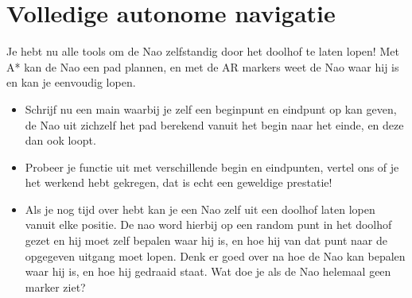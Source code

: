 \documentclass[a4paper]{article}
\begin{document}
\section{Volledige autonome navigatie}

Je hebt nu alle tools om de Nao zelfstandig door het doolhof te laten lopen! Met A* kan de Nao een pad plannen, en met de AR markers weet de Nao waar hij is en kan je eenvoudig lopen.

\begin{Exercise}
\begin{itemize}
\item Schrijf nu een main waarbij je zelf een beginpunt en eindpunt op kan geven, de Nao uit zichzelf het pad berekend vanuit het begin naar het einde, en deze dan ook loopt.
\item Probeer je functie uit met verschillende begin en eindpunten, vertel ons of je het werkend hebt gekregen, dat is echt een geweldige prestatie!
\item Als je nog tijd over hebt kan je een Nao zelf uit een doolhof laten lopen vanuit elke positie. De nao word hierbij op een random punt in het doolhof gezet en hij moet zelf bepalen waar hij is, en hoe hij van dat punt naar de opgegeven uitgang moet lopen. Denk er goed over na hoe de Nao kan bepalen waar hij is, en hoe hij gedraaid staat. Wat doe je als de Nao helemaal geen marker ziet?
\end{itemize}
\end{Exercise}
\vspace{10 mm}
\end{document}
